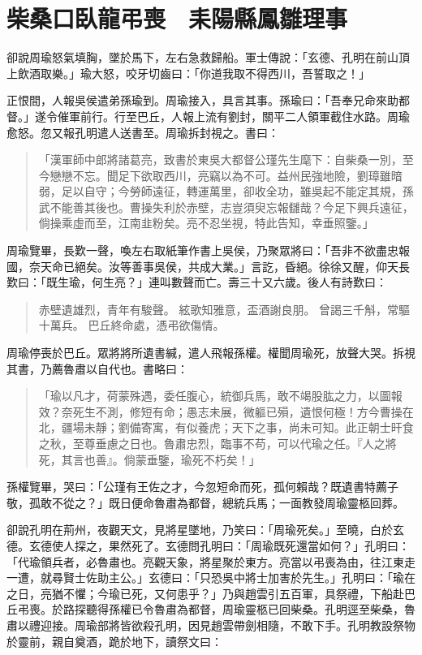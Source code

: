 
\chapter{柴桑口臥龍弔喪　耒陽縣鳳雛理事}

卻說周瑜怒氣填胸，墜於馬下，左右急救歸船。軍士傳說：「玄德、孔明在前山頂上飲酒取樂。」瑜大怒，咬牙切齒曰：「你道我取不得西川，吾誓取之！」

正恨間，人報吳侯遣弟孫瑜到。周瑜接入，具言其事。孫瑜曰：「吾奉兄命來助都督。」遂令催軍前行。行至巴丘，人報上流有劉封，關平二人領軍截住水路。周瑜愈怒。忽又報孔明遣人送書至。周瑜拆封視之。書曰：

\begin{quote}
「漢軍師中郎將諸葛亮，致書於東吳大都督公瑾先生麾下：自柴桑一別，至今戀戀不忘。聞足下欲取西川，亮竊以為不可。益州民強地險，劉璋雖暗弱，足以自守；今勞師遠征，轉運萬里，卻收全功，雖吳起不能定其規，孫武不能善其後也。曹操失利於赤壁，志豈須臾忘報讎哉？今足下興兵遠征，倘操乘虛而至，江南韭粉矣。亮不忍坐視，特此告知，幸垂照鑒。」
\end{quote}

周瑜覽畢，長歎一聲，喚左右取紙筆作書上吳侯，乃聚眾將曰：「吾非不欲盡忠報國，奈天命已絕矣。汝等善事吳侯，共成大業。」言訖，昏絕。徐徐又醒，仰天長歎曰：「既生瑜，何生亮？」連叫數聲而亡。壽三十又六歲。後人有詩歎曰：

\begin{quote}
赤壁遺雄烈，青年有駿聲。
絃歌知雅意，盃酒謝良朋。
曾謁三千斛，常驅十萬兵。
巴丘終命處，憑弔欲傷情。
\end{quote}

周瑜停喪於巴丘。眾將將所遺書緘，遣人飛報孫權。權聞周瑜死，放聲大哭。拆視其書，乃薦魯肅以自代也。書略曰：

\begin{quote}
「瑜以凡才，荷蒙殊遇，委任腹心，統御兵馬，敢不竭股肱之力，以圖報效？奈死生不測，修短有命；愚志未展，微軀已殞，遺恨何極！方今曹操在北，疆場未靜；劉備寄寓，有似養虎；天下之事，尚未可知。此正朝士旰食之秋，至尊垂慮之日也。魯肅忠烈，臨事不苟，可以代瑜之任。『人之將死，其言也善』。倘蒙垂鑒，瑜死不朽矣！」
\end{quote}

孫權覽畢，哭曰：「公瑾有王佐之才，今忽短命而死，孤何賴哉？既遺書特薦子敬，孤敢不從之？」既日便命魯肅為都督，總統兵馬；一面教發周瑜靈柩回葬。

卻說孔明在荊州，夜觀天文，見將星墜地，乃笑曰：「周瑜死矣。」至曉，白於玄德。玄德使人探之，果然死了。玄德問孔明曰：「周瑜既死還當如何？」孔明曰：「代瑜領兵者，必魯肅也。亮觀天象，將星聚於東方。亮當以弔喪為由，往江東走一遭，就尋賢士佐助主公。」玄德曰：「只恐吳中將士加害於先生。」孔明曰：「瑜在之日，亮猶不懼；今瑜已死，又何患乎？」乃與趙雲引五百軍，具祭禮，下船赴巴丘弔喪。於路探聽得孫權已令魯肅為都督，周瑜靈柩已回柴桑。孔明逕至柴桑，魯肅以禮迎接。周瑜部將皆欲殺孔明，因見趙雲帶劍相隨，不敢下手。孔明教設祭物於靈前，親自奠酒，跪於地下，讀祭文曰：

